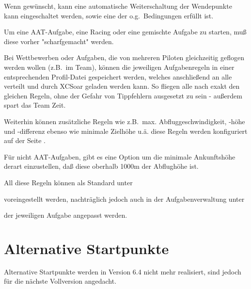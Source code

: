 Wenn gewünscht, kann eine automatische Weiterschaltung der Wendepunkte kann eingeschaltet werden, sowie eine der o.g.\ Bedingungen erfüllt ist.

Um eine AAT-Aufgabe, eine Racing oder eine gemischte Aufgabe zu starten, muß diese vorher "scharfgemacht" werden.

\tip Bei Wettbewerben oder Aufgaben, die von mehreren Piloten gleichzeitig geflogen werden wollen (z.B.\ im Team), können die  jeweiligen Aufgabenregeln  in einer entsprechenden Profil-Datei  gespeichert werden, welches anschließend an alle verteilt und durch \textsf{XCSoar} geladen werden kann. So fliegen alle nach exakt den gleichen Regeln, ohne der Gefahr von Tippfehlern ausgesetzt zu sein - außerdem spart das Team Zeit.

Weiterhin können zusätzliche Regeln wie z.B.\ max. Abfluggeschwindigkeit, -höhe und -differenz ebenso wie minimale Zielhöhe u.ä. diese Regeln werden konfiguriert auf der Seite .

Für nicht AAT-Aufgaben, gibt es eine Option um die minimale Ankunftshöhe derart einzustellen, daß diese oberhalb 1000m der Abflughöhe ist.

All diese Regeln können als Standard unter 
\begin{quote}
\blink{}\blink{}\blink{}
\end{quote}

voreingestellt werden, nachträglich jedoch auch in der Aufgabenverwaltung unter
\begin{quote}
\blink{}\blink{}
\end{quote}
der jeweiligen Aufgabe angepasst werden.


\section{Alternative Startpunkte}\label{sec:alternate-starts}

Alternative Startpunkte werden in Version 6.4 nicht mehr realisiert, sind jedoch für die nächste Vollversion angedacht.



